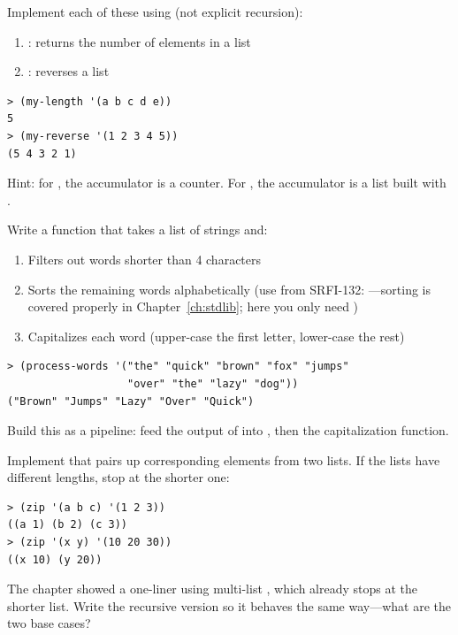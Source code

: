 \begin{exercise}
Implement each of these using  (not explicit recursion):

\begin{enumerate}
\item {}: returns the number of elements in a list
\item {}: reverses a list
\end{enumerate}

\begin{lstlisting}[style=repl]
> (my-length '(a b c d e))
5
> (my-reverse '(1 2 3 4 5))
(5 4 3 2 1)
\end{lstlisting}

Hint: for , the accumulator is a counter. For , the accumulator is a list built with .
\end{exercise}

\begin{exercise}
Write a function  that takes a list of strings and:
\begin{enumerate}
\item Filters out words shorter than 4 characters
\item Sorts the remaining words alphabetically (use  from SRFI-132: ---sorting is covered properly in Chapter~\ref{ch:stdlib}; here you only need )
\item Capitalizes each word (upper-case the first letter, lower-case the rest)
\end{enumerate}

\begin{lstlisting}[style=repl]
> (process-words '("the" "quick" "brown" "fox" "jumps"
                   "over" "the" "lazy" "dog"))
("Brown" "Jumps" "Lazy" "Over" "Quick")
\end{lstlisting}

Build this as a pipeline: feed the output of  into , then  the capitalization function.
\end{exercise}

\begin{exercise}
Implement  that pairs up corresponding elements from two lists. If the lists have different lengths, stop at the shorter one:

\begin{lstlisting}[style=repl]
> (zip '(a b c) '(1 2 3))
((a 1) (b 2) (c 3))
> (zip '(x y) '(10 20 30))
((x 10) (y 20))
\end{lstlisting}

The chapter showed a one-liner using multi-list , which already stops at the shorter list. Write the recursive version so it behaves the same way---what are the two base cases?
\end{exercise}

